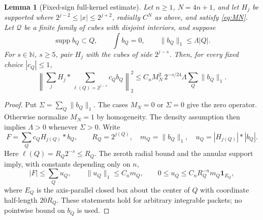 \documentclass[11pt]{article}
\numberwithin{equation}{section}
\newtheorem{lemma}[theorem]{Lemma}
\theoremstyle{remark}
\theoremstyle{definition}
\newcommand{\supp}{\operatorname{supp}}
\newcommand{\cQ}{\mathcal Q}
\newcommand{\norm}[1]{\lVert #1\rVert}
\begin{document}
\begin{lemma}[Fixed-sign full-kernel estimate]\label{lem:fullkernel}
Let $n\ge1$, $N=4n+1$, and let $H_j$ be supported where
$2^{j-2}\le|x|\le2^{j+2}$, radially $C^N$ as above, and satisfy
\eqref{eq:MN}.  Let $\cQ$ be a
finite family of cubes with disjoint interiors, and suppose
\[
 \supp b_Q\subset Q,\qquad \int b_Q=0,\qquad
 \norm{b_Q}_1\le\Lambda|Q|.
\]
For $s\in\mathbb N$, $s\ge5$, pair $H_j$ with the cubes of side
$2^{j-s}$.  Then, for every fixed choice $|c_Q|\le1$,
\begin{equation}\label{eq:fullkernel}
 \left\|\sum_jH_j*\!\sum_{\ell(Q)=2^{j-s}}c_Qb_Q\right\|_2^2
 \le C_nM_N^2\,2^{-s/24}\Lambda\sum_Q\norm{b_Q}_1.
\end{equation}
\end{lemma}

\begin{proof}
Put $\Sigma=\sum_Q\norm{b_Q}_1$. The cases $M_N=0$ or
$\Sigma=0$ give the zero operator. Otherwise normalize $M_N=1$ by
homogeneity. The density assumption then implies $\Lambda>0$ whenever
$\Sigma>0$. Write
\[
 F=\sum_Q c_Q H_{j(Q)}*b_Q,\qquad
 R_Q=2^{j(Q)},\quad m_Q=\norm{b_Q}_1,
 \quad u_Q=|H_{j(Q)}|*|b_Q|.
\]
Here $\ell(Q)=R_Q2^{-s}\le R_Q$. The zeroth radial bound and the
annular support imply, with constants depending only on $n$,
\[
 |F|\le\sum_Q u_Q,\qquad
 \norm{u_Q}_1\le C_n m_Q,\qquad
 0\le u_Q\le C_nR_Q^{-n}m_Q\mathbf1_{E_Q},
\]
where $E_Q$ is the axis-parallel closed box about the center of $Q$
with coordinate half-length $20R_Q$.
These statements hold for arbitrary integrable packets; no pointwise
bound on $b_Q$ is used.


\end{proof}
\end{document}
